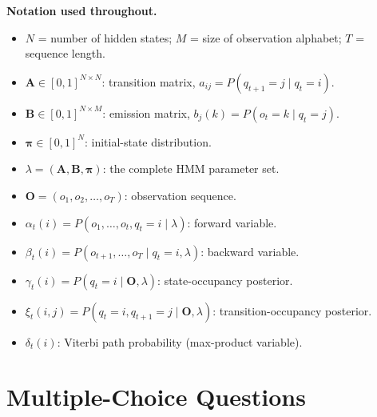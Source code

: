 \documentclass[12pt]{article}
\begin{document}
\medskip
\noindent
\textbf{Notation used throughout.}
\begin{itemize}
    \item $N$ = number of hidden states; $M$ = size of observation alphabet;
          $T$ = sequence length.
    \item $\mathbf{A} \in [0,1]^{N\times N}$: transition matrix,
          $a_{ij} = P(q_{t+1}=j \mid q_t=i)$.
    \item $\mathbf{B} \in [0,1]^{N\times M}$: emission matrix,
          $b_j(k) = P(o_t=k \mid q_t=j)$.
    \item $\boldsymbol{\pi} \in [0,1]^N$: initial-state distribution.
    \item $\lambda = (\mathbf{A}, \mathbf{B}, \boldsymbol{\pi})$: the complete HMM parameter set.
    \item $\mathbf{O} = (o_1, o_2, \dots, o_T)$: observation sequence.
    \item $\alpha_t(i) = P(o_1,\dots,o_t, q_t=i \mid \lambda)$: forward variable.
    \item $\beta_t(i) = P(o_{t+1},\dots,o_T \mid q_t=i, \lambda)$: backward variable.
    \item $\gamma_t(i) = P(q_t=i \mid \mathbf{O}, \lambda)$: state-occupancy posterior.
    \item $\xi_t(i,j) = P(q_t=i, q_{t+1}=j \mid \mathbf{O}, \lambda)$:
          transition-occupancy posterior.
    \item $\delta_t(i)$: Viterbi path probability (max-product variable).
\end{itemize}

\newpage

\section{Multiple-Choice Questions}
\end{document}
